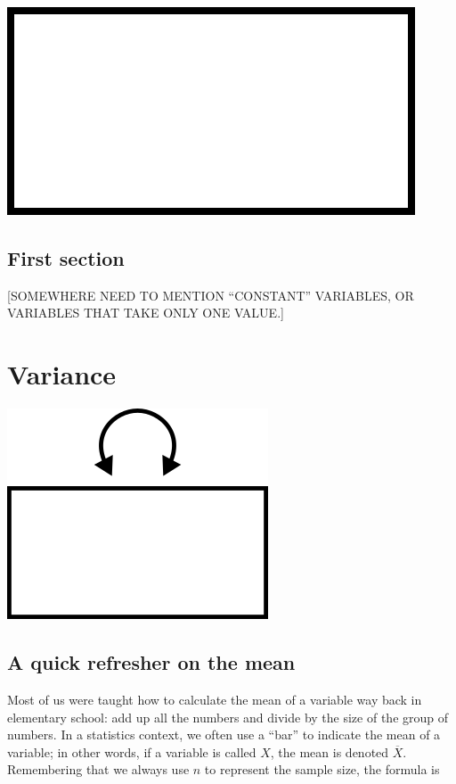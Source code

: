 \documentclass[
]{book}
\begin{document}
\begin{center}\includegraphics{graphics/variable} \end{center}

\hypertarget{variables-first-section}{%
\section{First section}\label{variables-first-section}}

{[}SOMEWHERE NEED TO MENTION ``CONSTANT'' VARIABLES, OR VARIABLES THAT TAKE ONLY ONE VALUE.{]}

\hypertarget{variance}{%
\chapter{Variance}\label{variance}}

\begin{center}\includegraphics{graphics/variance} \end{center}

\hypertarget{variance-mean}{%
\section{A quick refresher on the mean}\label{variance-mean}}

Most of us were taught how to calculate the mean of a variable way back in elementary school: add up all the numbers and divide by the size of the group of numbers. In a statistics context, we often use a ``bar'' to indicate the mean of a variable; in other words, if a variable is called \(X\), the mean is denoted \(\overline{X}\). Remembering that we always use \(n\) to represent the sample size, the formula is
\end{document}
